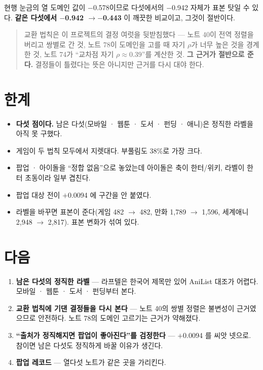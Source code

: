 \documentclass[10pt]{article}
\begin{document}
{현행 눈금의 열 도메인 값이 $-$0.578이므로 다섯에서의 $-$0.942 자체가 표본
탓일 수 있다. \textbf{같은 다섯에서 $-$0.942 $\to-$0.443} 이 깨끗한 비교이고,
그것이 절반이다.}

\begin{quote}\fontsize{9.5}{11.5}\selectfont
교환 법칙은 이 프로젝트의 결정 여럿을 뒷받침했다 --- 노트 40이 전역 정렬을
버리고 쌍별로 간 것, 노트 78이 도메인을 고를 때 자기 $\rho$가 너무 높은 것을
경계한 것, 노트 74가 ``교차점 자기 $\rho\approx0.39$''를 계산한 것.
\textbf{그 근거가 절반으로 준다.} 결정들이 틀렸다는 뜻은 아니지만 근거를
다시 대야 한다.
\end{quote}

\section{한계}

\begin{itemize}[leftmargin=1.1em,itemsep=0.15em]
\item \textbf{다섯 점이다.} 남은 다섯(모바일 · 웹툰 · 도서 · 펀딩 · 애니)은
      정직한 라벨을 아직 못 구했다.
\item 게임이 두 법칙 모두에서 지렛대다. 부풀림도 38\%로 가장 크다.
\item 팝업 · 아이돌을 ``정합 없음''으로 놓았는데 아이돌은 축이 한터/위키,
      라벨이 한터 초동이라 일부 겹친다.
\item 팝업 대상 전이 $+$0.0094 에 구간을 안 붙였다.
\item 라벨을 바꾸면 표본이 준다(게임 482 $\to$ 482, 만화 1,789 $\to$ 1,596,
      세계애니 2,948 $\to$ 2,817). 표본 변화가 섞여 있다.
\end{itemize}

\section{다음}

\begin{enumerate}[leftmargin=1.3em,itemsep=0.15em]
\item \textbf{남은 다섯의 정직한 라벨} --- 라프텔은 한국어 제목만 있어
      AniList 대조가 어렵다. 모바일 · 웹툰 · 도서 · 펀딩부터 본다.
\item \textbf{교환 법칙에 기댄 결정들을 다시 본다} --- 노트 40의 쌍별 정렬은
      불변성이 근거였으므로 안전하다. 노트 78의 도메인 고르기는 근거가
      약해졌다.
\item \textbf{``출처가 정직해지면 팝업이 좋아진다''를 검정한다} --- $+$0.0094
      를 씨앗 넷으로. 참이면 남은 다섯도 정직하게 바꿀 이유가 생긴다.
\item \textbf{팝업 레코드} --- 열다섯 노트가 같은 곳을 가리킨다.
\end{enumerate}
\end{document}

